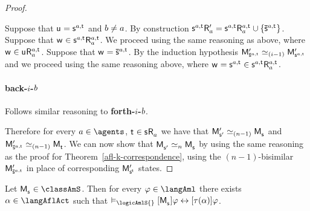 \begin{proof}
\begin{enumerate}
        Suppose that $\aStateU = \aStateS[\agentA,\aStateT]$ and $b \neq a$. 
        By construction $\aStateS[\agentA,\aStateT] \aAccessibilityP{\agentA} = \aStateS[\agentA,\aStateT] \aAccessibility[\agentA,\aStateT]{\agentA} \cup \{\aPStateS[\agentA,\aStateT]\}$. 
        Suppose that $\aStateW \in \aStateS[\agentA,\aStateT] \aAccessibility[\agentA,\aStateT]{\agentA}$. 
        We proceed using the same reasoning as above, where $\aStateW \in \aStateU \aAccessibility[\agentA,\aStateT]{\agentA}$. 
        Suppose that $\aStateW = \aPStateS[\agentA,\aStateT]$.
        By the induction hypothesis $\aPModelP{\aPStateS[\agentA,\aStateT]} \bisimilar[(i - 1)] \aPModelP{\aStateS[\agentA,\aStateT]}$ and we proceed using the same reasoning above, where $\aStateW = \aStateS[\agentA,\aStateT] \in \aStateS[\agentA,\aStateT] \aAccessibility[\agentA,\aStateT]{\agentA}$.

        \paragraph{back-$i$-$b$} Follows similar reasoning to {\bf forth-$i$-$b$}.
\end{enumerate}

Therefore for every $\agentA \in \agents$, $\aStateT \in \aStateS \aAccessibility{\agentA}$ we have that $\aPModelP{\aStateSP} \bisimilar[(n - 1)] \aPModel{\aStateS}$ and $\aPModelP{\aPStateS[\agentA,\aStateT]} \bisimilar[(n - 1)] \aPModel{\aStateT}$.
We can now show that $\aPModel{\aStateSP} \bisimilar[n] \aPModel{\aStateS}$ by using the same reasoning as the proof for Theorem~\ref{afl-k-correspondence}, using the $(n-1)$-bisimilar $\aPModelP{\aPStateS[\agentA,\aStateT]}$ in place of corresponding $\aPModelP{\aStateS[\aStateT]}$ states.
\end{proof}

\begin{corollary}
Let $\aPModel{\aStateS} \in \classAmS$.
Then for every $\phi \in \langAml$ there exists $\alpha \in \langAflAct$ such that $\entails_\logicAmlS{} \actionA{\aPModel{\aStateS}} \phi \iff \actionA{\tau(\alpha)} \phi$.
\end{corollary}
